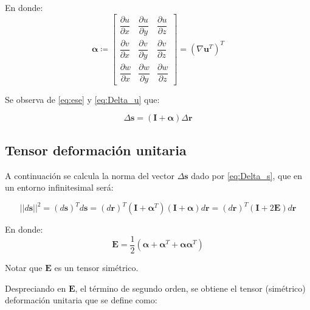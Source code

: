 En donde:
\begin{equation}
	\bm{\alpha} \coloneqq \begin{bmatrix}
		\dfrac{\partial u}{\partial x} & \dfrac{\partial u}{\partial y} & \dfrac{\partial u}{\partial z} \\[5mm]
		\dfrac{\partial v}{\partial x} & \dfrac{\partial v}{\partial y} & \dfrac{\partial v}{\partial z} \\[5mm]
		\dfrac{\partial w}{\partial x} & \dfrac{\partial w}{\partial y} & \dfrac{\partial w}{\partial z}
	\end{bmatrix} = \left( \nabla \mathbf{u}^T \right)^T
\end{equation}

Se observa de \eqref{eq:ese} y \eqref{eq:Delta_u} que:

\begin{equation}
	\Delta \mathbf{s} = \left( \mathbf{I} + \bm{\alpha} \right) \Delta \mathbf{r}
	\label{eq:Delta_s}
\end{equation}

\subsection{Tensor deformación unitaria}
A continuación se calcula la norma del vector $\Delta \mathbf{s}$ dado por \eqref{eq:Delta_s}, que en un entorno infinitesimal será:

\begin{equation}
	|| d \mathbf{s} ||^2 = \left(d \mathbf{s}\right)^T d \mathbf{s} = \left(d \mathbf{r}\right)^T \left( \mathbf{I} + \bm{\alpha}^T \right) \left( \mathbf{I} + \bm{\alpha} \right) d \mathbf{r} = \left(d \mathbf{r}\right)^T \left(\mathbf{I} + 2 \mathbf{E} \right) d \mathbf{r}
\end{equation}

En donde:
\begin{equation}
	\mathbf{E} = \dfrac{1}{2} \left(\bm{\alpha} + \bm{\alpha}^T + \bm{\alpha}\bm{\alpha}^T \right)
\end{equation}

Notar que $\mathbf{E}$ es un tensor simétrico.

Despreciando en $\mathbf{E}$, el término de segundo orden, se obtiene el tensor (simétrico) deformación unitaria que se define como:

